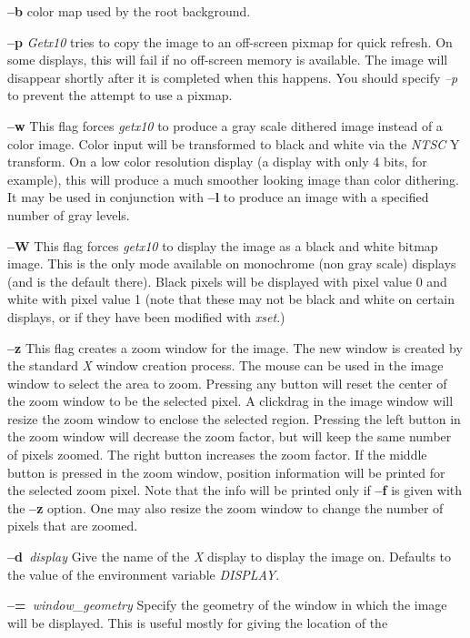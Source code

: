 \begin{TPlist}{{\bf --b}}
color map used by the root background.
\item[{{\bf --p}}]
{\it Getx10}
tries to copy the image to an off-screen pixmap for quick refresh.  On
some displays, this will fail if no off-screen memory is available.
The image will disappear shortly after it is completed when this
happens.  You should specify 
{\it --p}
to prevent the attempt to use a pixmap.
\item[{{\bf --w}}]
This flag forces
{\it getx10}
to produce a gray scale dithered image instead of a color image.
Color input will be transformed to black and white via the
{\it NTSC} Y
transform.  On a low color resolution display (a display with only 4
bits, for example), this will produce a much smoother looking image
than color dithering.  It may be used in conjunction with
{\bf --l}
to produce an image with a specified number of gray levels.
\item[{{\bf --W}}]
This flag forces
{\it getx10}
to display the image as a black and white bitmap image.  This is the
only mode available on monochrome (non gray scale) displays (and is
the default there).  Black pixels will be displayed with pixel value 0
and white with pixel value 1 (note that these may not be black and
white on certain displays, or if they have been modified with 
{\it xset}{\rm .)}
\item[{{\bf --z}}]
This flag creates a zoom window for the image.  The new window is created by 
the standard 
{\it X}
window creation process.  The mouse can be used in the image window to select
the area to zoom.  Pressing any button will reset the center of the zoom
window to be the selected pixel.  A clickdrag in the image window will resize
the zoom window to enclose the selected region.  Pressing the left button in
the zoom window will decrease the zoom factor, but will keep the same number 
of pixels zoomed.  The right button increases the zoom factor.  If the middle
button is pressed in the zoom window, position information will be printed
for the selected zoom pixel.  Note that the info will be printed only if
{\bf --f}
is given with the
{\bf --z}
option.  One may also resize the zoom window to change the number of pixels
that are zoomed.
\item[{{\bf --d}{\it \ display}
}]
Give the name of the 
{\it X}
display to display the image on.  Defaults to the value of the
environment variable
{\it DISPLAY}{\rm .}
\item[{{\bf --=}{\it \ window\_geometry}
}]
Specify the geometry of the window in which the image will be
displayed.  This is useful mostly for giving the location of the

\end{TPlist}
